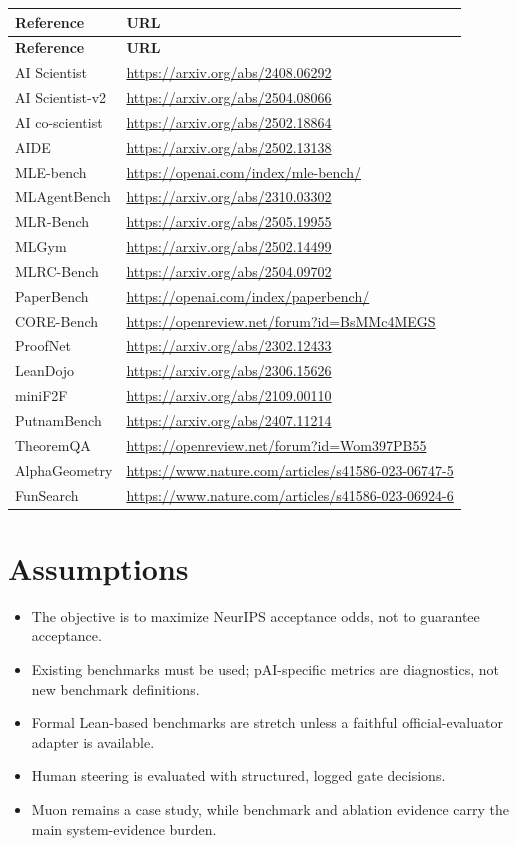 \documentclass[11pt]{article}
\newcommand{\pai}{pAI}
\begin{document}
\small
\begin{longtable}{>{\raggedright\arraybackslash}p{} >{\raggedright\arraybackslash}p{}}
\toprule
\textbf{Reference} & \textbf{URL} \\
\midrule
\endfirsthead
\toprule
\textbf{Reference} & \textbf{URL} \\
\midrule
\endhead
AI Scientist & \url{https://arxiv.org/abs/2408.06292} \\
AI Scientist-v2 & \url{https://arxiv.org/abs/2504.08066} \\
AI co-scientist & \url{https://arxiv.org/abs/2502.18864} \\
AIDE & \url{https://arxiv.org/abs/2502.13138} \\
MLE-bench & \url{https://openai.com/index/mle-bench/} \\
MLAgentBench & \url{https://arxiv.org/abs/2310.03302} \\
MLR-Bench & \url{https://arxiv.org/abs/2505.19955} \\
MLGym & \url{https://arxiv.org/abs/2502.14499} \\
MLRC-Bench & \url{https://arxiv.org/abs/2504.09702} \\
PaperBench & \url{https://openai.com/index/paperbench/} \\
CORE-Bench & \url{https://openreview.net/forum?id=BsMMc4MEGS} \\
ProofNet & \url{https://arxiv.org/abs/2302.12433} \\
LeanDojo & \url{https://arxiv.org/abs/2306.15626} \\
miniF2F & \url{https://arxiv.org/abs/2109.00110} \\
PutnamBench & \url{https://arxiv.org/abs/2407.11214} \\
TheoremQA & \url{https://openreview.net/forum?id=Wom397PB55} \\
AlphaGeometry & \url{https://www.nature.com/articles/s41586-023-06747-5} \\
FunSearch & \url{https://www.nature.com/articles/s41586-023-06924-6} \\
\bottomrule
\end{longtable}
\normalsize

\section*{Assumptions}

\begin{itemize}
  \item The objective is to maximize NeurIPS acceptance odds, not to guarantee acceptance.
  \item Existing benchmarks must be used; \pai{}-specific metrics are diagnostics, not new benchmark definitions.
  \item Formal Lean-based benchmarks are stretch unless a faithful official-evaluator adapter is available.
  \item Human steering is evaluated with structured, logged gate decisions.
  \item Muon remains a case study, while benchmark and ablation evidence carry the main system-evidence burden.
\end{itemize}
\end{document}
